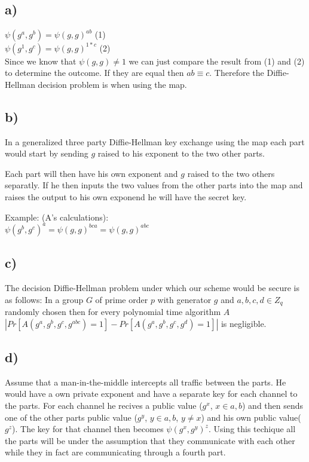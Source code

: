 \documentclass[a4paper,11pt]{article}
\begin{document}
	\subsection*{a)}

	$ \psi(g^a, g^b) = \psi(g, g)^{ab}$ (1)\\
	$ \psi(g^1, g^c) = \psi(g, g)^{1*c}$ (2)\\
	Since we know that $\psi(g, g) \neq 1$ we can just compare the result from (1) and (2) to determine the outcome. If they are equal then $ ab \equiv c$.
	Therefore the Diffie-Hellman decision problem is when using the map.

	\subsection*{b) }
	In a generalized three party Diffie-Hellman key exchange using the map each part would 
	start by sending $g$ raised to his exponent to the two other parts.

	Each part will then have his own exponent and $g$ raised to the two others separatly.
	If he then inputs the two values from the other parts into the map and raises the output
	to his own exponend he will have the secret key.

	Example: (A's calculations):\\
	$ \psi(g^b, g^c)^a = \psi(g, g)^{bca} = \psi(g, g)^{abc} $

	\subsection*{c) }
	The decision Diffie-Hellman problem under which our scheme would be secure is as follows:
	In a group $G$ of prime order $p$ with generator $g$ and $a, b, c, d \in Z_q$ randomly chosen then for every polynomial time algorithm $A$\\
	$|Pr [ A(g^a, g^b, g^c, g^{abc}) = 1 ] - Pr [ A(g^a, g^b, g^c, g^d) = 1] | $ is negligible.

	\subsection*{d) }
	Assume that a man-in-the-middle intercepts all traffic between the parts. He would have a
	own private exponent and have a separate key for each channel to the parts. For each channel
	he recives a public value ($g^x$, $x \in {a, b}$) and then sends one of the other parts public value ($g^y$, $y \in {a,b}$, $y \neq x$) and his own public value($g^z$). 
	The key for that channel then becomes $\psi(g^x, g^y)^z$. Using this techique all the parts
	will be under the assumption that they communicate with each other while they in fact are
	communicating through a fourth part.
\end{document}
